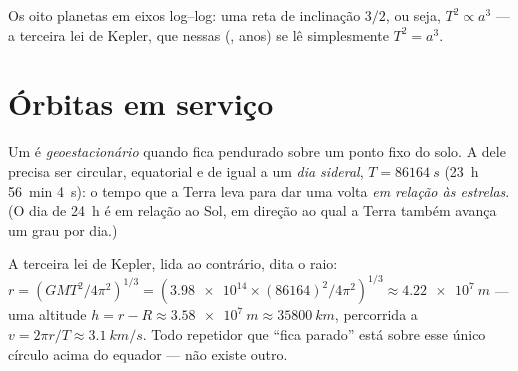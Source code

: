 \begin{omfigure}

{\small Os oito planetas em eixos log--log: uma reta de inclinação $3/2$, ou seja,
$T^2 \propto a^3$ --- a terceira lei de Kepler, que nessas  (, anos) se lê simplesmente $T^2 = a^3$.}
\end{omfigure}

\section{Órbitas em serviço}

\begin{definition}\label{def:g12:satellites-kepler:geo}
Um  é \emph{geoestacionário} quando fica
pendurado sobre um ponto fixo do solo. A  dele precisa ser circular, equatorial
e de  igual a um \emph{dia sideral},
$T = \qty{86164}{s}$ (\qty{23}{h} \qty{56}{min} \qty{4}{s}): o tempo que a Terra leva
para dar uma volta \emph{em relação às estrelas}. (O dia de \qty{24}{h} é em relação
ao Sol, em direção ao qual a Terra também avança um grau por dia.)
\end{definition}

\begin{example}\label{ex:g12:satellites-kepler:geoalt}
A terceira lei de Kepler, lida ao contrário, dita o raio:
$r = \left(GMT^2/4\pi^2\right)^{1/3} =
\left(\num{3.98e14} \times (\num{86164})^2/4\pi^2\right)^{1/3} \approx
\qty{4.22e7}{m}$ --- uma altitude $h = r - R \approx \qty{3.58e7}{m} \approx
\qty{35800}{km}$, percorrida a $v = 2\pi r/T \approx \qty{3.1}{km/s}$. Todo repetidor
que ``fica parado'' está sobre esse único círculo acima do equador --- não existe
outro.
\end{example}

